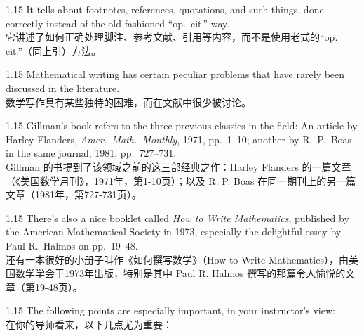 \documentclass[12pt,a4paper]{article}
\newcommand{\bilingual}[2]{
    \begin{spacing}{1.15} %
        \noindent \normalsize #1 \\[-0.5ex] %
        \small \textcolor{blue!70!black}{#2} %
    \end{spacing}
    \vspace{0.8em} %
}
\begin{document}
\bilingual{It tells about footnotes, references, quotations, and such things, done correctly instead of the old-fashioned ``op.\ cit.'' way.}{它讲述了如何正确处理脚注、参考文献、引用等内容，而不是使用老式的“op. cit.”（同上引）方法。}

\bilingual{Mathematical writing has certain peculiar problems that have rarely been discussed in the literature.}{数学写作具有某些独特的困难，而在文献中很少被讨论。}

\bilingual{Gillman's book refers to the three previous classics in the field: An article by Harley Flanders, \textit{Amer.\ Math.\ Monthly}, 1971, pp.\ 1--10; another by R.\ P.\ Boas in the same journal, 1981, pp.\ 727--731.}{Gillman 的书提到了该领域之前的这三部经典之作：Harley Flanders 的一篇文章（《美国数学月刊》，1971年，第1-10页）；以及 R. P. Boas 在同一期刊上的另一篇文章（1981年，第727-731页）。}

\bilingual{There's also a nice booklet called \textit{How to Write Mathematics}, published by the American Mathematical Society in 1973, especially the delightful essay by Paul R.\ Halmos on pp.\ 19--48.}{还有一本很好的小册子叫作《如何撰写数学》（How to Write Mathematics），由美国数学学会于1973年出版，特别是其中 Paul R. Halmos 撰写的那篇令人愉悦的文章（第19-48页）。}

\bilingual{The following points are especially important, in your instructor's view:}{在你的导师看来，以下几点尤为重要：}
\end{document}
